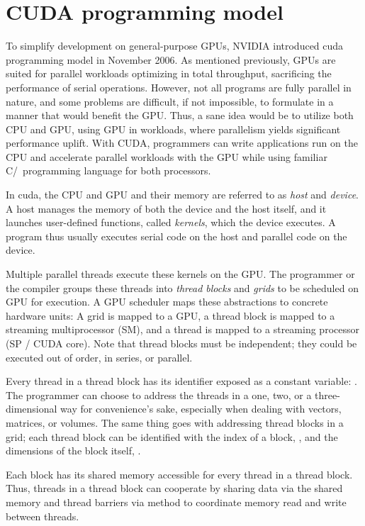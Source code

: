 \section{CUDA programming model} \label{label:cuda}

To simplify development on general-purpose GPUs, NVIDIA introduced \acrfull{cuda} programming model in November 2006. As mentioned previously, GPUs are suited for parallel workloads optimizing in total throughput, sacrificing the performance of serial operations. However, not all programs are fully parallel in nature, and some problems are difficult, if not impossible, to formulate in a manner that would benefit the GPU. Thus, a sane idea would be to utilize both CPU and GPU, using GPU in workloads, where parallelism yields significant performance uplift. With CUDA, programmers can write applications run on the CPU and accelerate parallel workloads with the GPU while using familiar C/\CC\ programming language for both processors.

In \acrshort{cuda}, the CPU and GPU and their memory are referred to as \textit{host} and \textit{device}. A host manages the memory of both the device and the host itself, and it launches user-defined functions, called \textit{kernels}, which the device executes. A program thus usually executes serial code on the host and parallel code on the device.

Multiple parallel threads execute these kernels on the GPU. The programmer or the compiler groups these threads into \textit{thread blocks} and \textit{grids} to be scheduled on GPU for execution. A GPU scheduler maps these abstractions to concrete hardware units: A grid is mapped to a GPU, a thread block is mapped to a streaming multiprocessor (SM), and a thread is mapped to a streaming processor (SP / CUDA core). Note that thread blocks must be independent; they could be executed out of order, in series, or parallel.

Every thread in a thread block has its identifier exposed as a constant variable: . The programmer can choose to address the threads in a one, two, or a three-dimensional way for convenience's sake, especially when dealing with vectors, matrices, or volumes. The same thing goes with addressing thread blocks in a grid; each thread block can be identified with the index of a block, , and the dimensions of the block itself, .

Each block has its shared memory accessible for every thread in a thread block. Thus, threads in a thread block can cooperate by sharing data via the shared memory and thread barriers via  method to coordinate memory read and write between threads.

